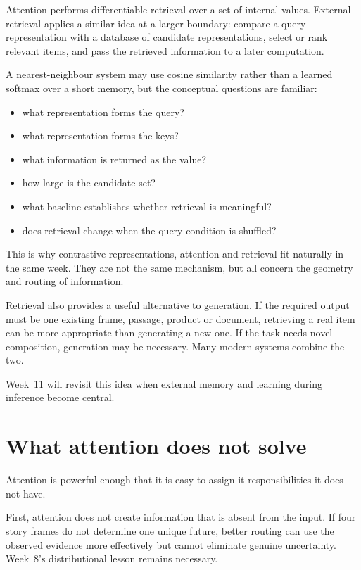 Attention performs differentiable retrieval over a set of internal values. External retrieval applies a similar idea at a larger boundary: compare a query representation with a database of candidate representations, select or rank relevant items, and pass the retrieved information to a later computation.

A nearest-neighbour system may use cosine similarity rather than a learned softmax over a short memory, but the conceptual questions are familiar:
\begin{itemize}[leftmargin=*]
  \item what representation forms the query?
  \item what representation forms the keys?
  \item what information is returned as the value?
  \item how large is the candidate set?
  \item what baseline establishes whether retrieval is meaningful?
  \item does retrieval change when the query condition is shuffled?
\end{itemize}

This is why contrastive representations, attention and retrieval fit naturally in the same week. They are not the same mechanism, but all concern the geometry and routing of information.

Retrieval also provides a useful alternative to generation. If the required output must be one existing frame, passage, product or document, retrieving a real item can be more appropriate than generating a new one. If the task needs novel composition, generation may be necessary. Many modern systems combine the two.

Week~11 will revisit this idea when external memory and learning during inference become central.

\section{What attention does not solve}

Attention is powerful enough that it is easy to assign it responsibilities it does not have.

First, attention does not create information that is absent from the input. If four story frames do not determine one unique future, better routing can use the observed evidence more effectively but cannot eliminate genuine uncertainty. Week~8's distributional lesson remains necessary.

